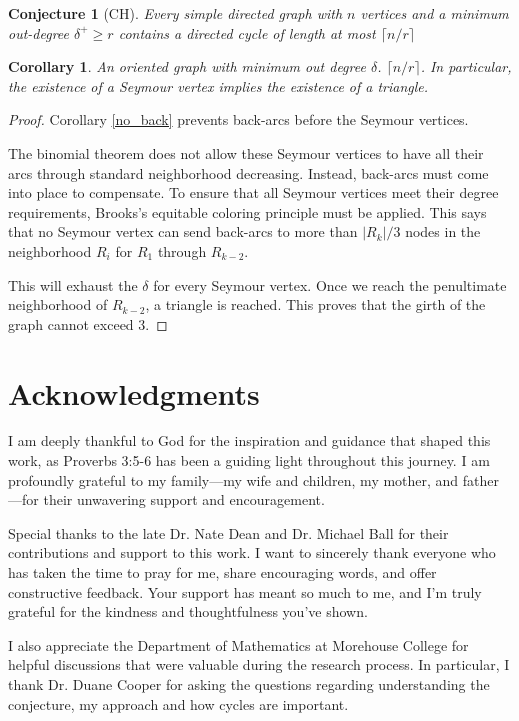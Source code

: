 \documentclass[AMS, Times1COL]{article} %
\newtheorem{corollary}[theorem]{Corollary}
\newtheorem{conjecture}[theorem]{Conjecture}
\theoremstyle{definition}
\begin{document}
	
	\begin{conjecture}[CH]
		Every simple directed graph with $n$ vertices and a minimum out-degree $\delta^+ \ge r$ contains a directed cycle of length at most $\lceil n/r \rceil$
	\end{conjecture}
	
	\begin{corollary}
		An oriented graph with minimum out degree $\delta$. $\lceil n/r \rceil$. In particular, the existence of a Seymour vertex implies the existence of a triangle.
	\end{corollary}
	\begin{proof}
		Corollary \ref{no_back} prevents back-arcs before the Seymour vertices.
		
		The binomial theorem does not allow these Seymour vertices to have all their arcs through standard neighborhood decreasing. Instead, back-arcs must come into place to compensate.
		To ensure that all Seymour vertices meet their degree requirements, Brooks's equitable coloring principle must be applied.
		This says that no Seymour vertex can send back-arcs to more than $|R_k| / 3$ nodes in the neighborhood $R_i$ for $R_1$ through $R_{k-2}$.
		
		This will exhaust the $\delta$ for every Seymour vertex. Once we reach the penultimate neighborhood of $R_{k-2}$, a triangle is reached. This proves that the girth of the graph cannot exceed 3. 	
	\end{proof}
	
	\section{Acknowledgments}
	I am deeply thankful to God for the inspiration and guidance that shaped this work, as Proverbs 3:5-6 has been a guiding light throughout this journey. I am profoundly grateful to my family—my wife and children, my mother, and father—for their unwavering support and encouragement.
	
	Special thanks to the late Dr. Nate Dean and Dr. Michael Ball for their contributions and support to this work. I want to sincerely thank everyone who has taken the time to pray for me, share encouraging words, and offer constructive feedback. Your support has meant so much to me, and I’m truly grateful for the kindness and thoughtfulness you’ve shown.
	
	I also appreciate the Department of Mathematics at Morehouse College for helpful discussions that were valuable during the research process. In particular, I thank Dr. Duane Cooper for asking the questions regarding understanding the conjecture, my approach and how cycles are important.
	
\end{document}
